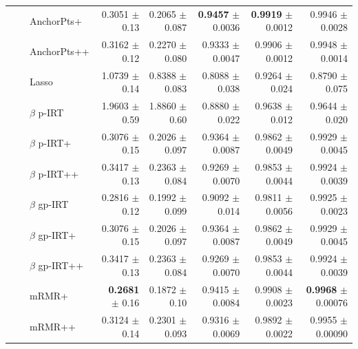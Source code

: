 \begin{longtable}{llp{}rrrrr}
 &  & AnchorPts+ & 0.3051 {\scriptsize $\pm$ 0.13} & 0.2065 {\scriptsize $\pm$ 0.087} & \textbf{0.9457} {\scriptsize $\pm$ 0.0036} & \textbf{0.9919} {\scriptsize $\pm$ 0.0012} & 0.9946 {\scriptsize $\pm$ 0.0028} \\
 &  & AnchorPts++ & 0.3162 {\scriptsize $\pm$ 0.12} & 0.2270 {\scriptsize $\pm$ 0.080} & 0.9333 {\scriptsize $\pm$ 0.0047} & 0.9906 {\scriptsize $\pm$ 0.0012} & 0.9948 {\scriptsize $\pm$ 0.0014} \\
 &  & Lasso & 1.0739 {\scriptsize $\pm$ 0.14} & 0.8388 {\scriptsize $\pm$ 0.083} & 0.8088 {\scriptsize $\pm$ 0.038} & 0.9264 {\scriptsize $\pm$ 0.024} & 0.8790 {\scriptsize $\pm$ 0.075} \\
 &  & $\beta$ p-IRT & 1.9603 {\scriptsize $\pm$ 0.59} & 1.8860 {\scriptsize $\pm$ 0.60} & 0.8880 {\scriptsize $\pm$ 0.022} & 0.9638 {\scriptsize $\pm$ 0.012} & 0.9644 {\scriptsize $\pm$ 0.020} \\
 &  & $\beta$ p-IRT+ & 0.3076 {\scriptsize $\pm$ 0.15} & 0.2026 {\scriptsize $\pm$ 0.097} & 0.9364 {\scriptsize $\pm$ 0.0087} & 0.9862 {\scriptsize $\pm$ 0.0049} & 0.9929 {\scriptsize $\pm$ 0.0045} \\
 &  & $\beta$ p-IRT++ & 0.3417 {\scriptsize $\pm$ 0.13} & 0.2363 {\scriptsize $\pm$ 0.084} & 0.9269 {\scriptsize $\pm$ 0.0070} & 0.9853 {\scriptsize $\pm$ 0.0044} & 0.9924 {\scriptsize $\pm$ 0.0039} \\
 &  & $\beta$ gp-IRT & 0.2816 {\scriptsize $\pm$ 0.12} & 0.1992 {\scriptsize $\pm$ 0.099} & 0.9092 {\scriptsize $\pm$ 0.014} & 0.9811 {\scriptsize $\pm$ 0.0056} & 0.9925 {\scriptsize $\pm$ 0.0023} \\
 &  & $\beta$ gp-IRT+ & 0.3076 {\scriptsize $\pm$ 0.15} & 0.2026 {\scriptsize $\pm$ 0.097} & 0.9364 {\scriptsize $\pm$ 0.0087} & 0.9862 {\scriptsize $\pm$ 0.0049} & 0.9929 {\scriptsize $\pm$ 0.0045} \\
 &  & $\beta$ gp-IRT++ & 0.3417 {\scriptsize $\pm$ 0.13} & 0.2363 {\scriptsize $\pm$ 0.084} & 0.9269 {\scriptsize $\pm$ 0.0070} & 0.9853 {\scriptsize $\pm$ 0.0044} & 0.9924 {\scriptsize $\pm$ 0.0039} \\
 &  & mRMR+ & \textbf{0.2681} {\scriptsize $\pm$ 0.16} & 0.1872 {\scriptsize $\pm$ 0.10} & 0.9415 {\scriptsize $\pm$ 0.0084} & 0.9908 {\scriptsize $\pm$ 0.0023} & \textbf{0.9968} {\scriptsize $\pm$ 0.00076} \\
 &  & mRMR++ & 0.3124 {\scriptsize $\pm$ 0.14} & 0.2301 {\scriptsize $\pm$ 0.093} & 0.9316 {\scriptsize $\pm$ 0.0069} & 0.9892 {\scriptsize $\pm$ 0.0022} & 0.9955 {\scriptsize $\pm$ 0.00090} \\
\end{longtable}